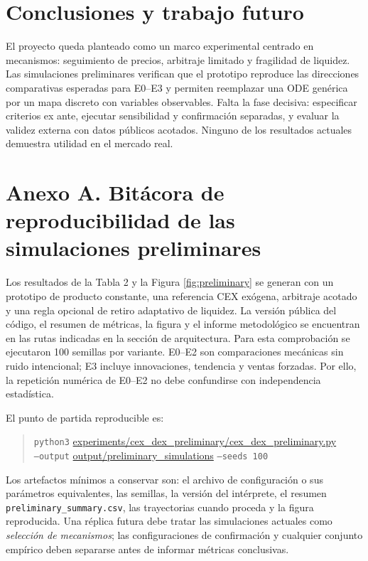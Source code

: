 \documentclass[11pt,a4paper]{article}
\begin{document}
\section{Conclusiones y trabajo futuro}
El proyecto queda planteado como un marco experimental centrado en mecanismos: seguimiento de precios, arbitraje limitado y fragilidad de liquidez. Las simulaciones preliminares verifican que el prototipo reproduce las direcciones comparativas esperadas para E0--E3 y permiten reemplazar una ODE genérica por un mapa discreto con variables observables. Falta la fase decisiva: especificar criterios ex ante, ejecutar sensibilidad y confirmación separadas, y evaluar la validez externa con datos públicos acotados. Ninguno de los resultados actuales demuestra utilidad en el mercado real.

\appendix
\section{Anexo A. Bitácora de reproducibilidad de las simulaciones preliminares}
\label{app:reproducibility}
Los resultados de la Tabla 2 y la Figura \ref{fig:preliminary} se generan con un prototipo de producto constante, una referencia CEX exógena, arbitraje acotado y una regla opcional de retiro adaptativo de liquidez. La versión pública del código, el resumen de métricas, la figura y el informe metodológico se encuentran en las rutas indicadas en la sección de arquitectura. Para esta comprobación se ejecutaron 100 semillas por variante. E0--E2 son comparaciones mecánicas sin ruido intencional; E3 incluye innovaciones, tendencia y ventas forzadas. Por ello, la repetición numérica de E0--E2 no debe confundirse con independencia estadística.

El punto de partida reproducible es:
\begin{quote}\small
\texttt{python3} \url{experiments/cex_dex_preliminary/cex_dex_preliminary.py}\\
\texttt{--output} \url{output/preliminary_simulations} \texttt{--seeds 100}
\end{quote}

Los artefactos mínimos a conservar son: el archivo de configuración o sus parámetros equivalentes, las semillas, la versión del intérprete, el resumen \texttt{preliminary\_summary.csv}, las trayectorias cuando proceda y la figura reproducida. Una réplica futura debe tratar las simulaciones actuales como \emph{selección de mecanismos}; las configuraciones de confirmación y cualquier conjunto empírico deben separarse antes de informar métricas conclusivas.
\end{document}
